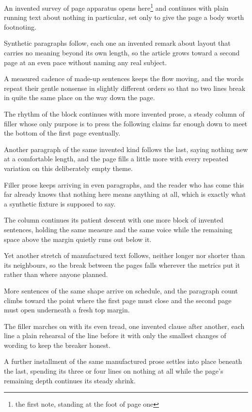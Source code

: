 \documentclass{article}
\begin{document}
An invented survey of page apparatus opens here\footnote{the first
note, standing at the foot of page one} and continues with plain
running text about nothing in particular, set only to give the page a
body worth footnoting.

Synthetic paragraphs follow, each one an invented remark about layout
that carries no meaning beyond its own length, so the article grows
toward a second page at an even pace without naming any real subject.

A measured cadence of made-up sentences keeps the flow moving, and the
words repeat their gentle nonsense in slightly different orders so that
no two lines break in quite the same place on the way down the page.

The rhythm of the block continues with more invented prose, a steady
column of filler whose only purpose is to press the following claims
far enough down to meet the bottom of the first page eventually.

Another paragraph of the same invented kind follows the last, saying
nothing new at a comfortable length, and the page fills a little more
with every repeated variation on this deliberately empty theme.

Filler prose keeps arriving in even paragraphs, and the reader who has
come this far already knows that nothing here means anything at all,
which is exactly what a synthetic fixture is supposed to say.

The column continues its patient descent with one more block of
invented sentences, holding the same measure and the same voice while
the remaining space above the margin quietly runs out below it.

Yet another stretch of manufactured text follows, neither longer nor
shorter than its neighbours, so the break between the pages falls
wherever the metrics put it rather than where anyone planned.

More sentences of the same shape arrive on schedule, and the paragraph
count climbs toward the point where the first page must close and the
second page must open underneath a fresh top margin.

The filler marches on with its even tread, one invented clause after
another, each line a plain rehearsal of the line before it with only
the smallest changes of wording to keep the breaker honest.

A further installment of the same manufactured prose settles into
place beneath the last, spending its three or four lines on nothing at
all while the page's remaining depth continues its steady shrink.
\end{document}
